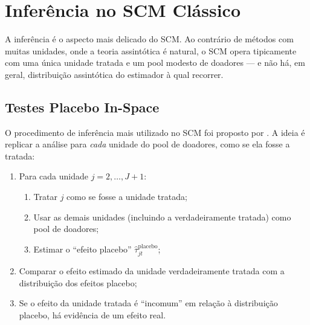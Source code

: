 \documentclass[12pt, a4paper, openany]{book}
\begin{document}
\section{Inferência no SCM Clássico}

A inferência é o aspecto mais delicado do SCM. Ao contrário de métodos com muitas unidades, onde a teoria assintótica é natural, o SCM opera tipicamente com uma única unidade tratada e um pool modesto de doadores --- e não há, em geral, distribuição assintótica do estimador à qual recorrer.

\subsection{Testes Placebo In-Space}

O procedimento de inferência mais utilizado no SCM foi proposto por \cite{AbadieDiamondHainmueller2015}. A ideia é replicar a análise para \textit{cada} unidade do pool de doadores, como se ela fosse a tratada:

\begin{enumerate}[leftmargin=1.5cm]
  \item Para cada unidade $j = 2, \ldots, J+1$:
  \begin{enumerate}
    \item[(a)] Tratar $j$ como se fosse a unidade tratada;
    \item[(b)] Usar as demais unidades (incluindo a verdadeiramente tratada) como pool de doadores;
    \item[(c)] Estimar o ``efeito placebo'' $\hat{\tau}_{jt}^{\text{placebo}}$;
  \end{enumerate}
  \item Comparar o efeito estimado da unidade verdadeiramente tratada com a distribuição dos efeitos placebo;
  \item Se o efeito da unidade tratada é ``incomum'' em relação à distribuição placebo, há evidência de um efeito real.
\end{enumerate}
\end{document}
